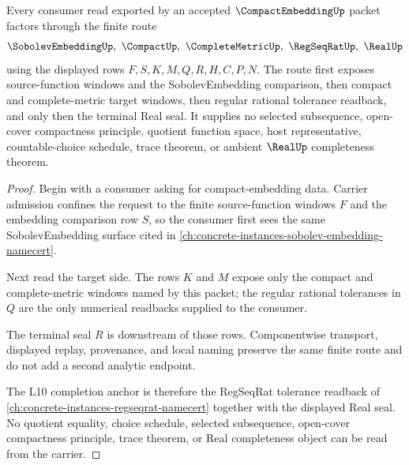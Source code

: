 \begin{theorem}
\label{thm:compact-embedding-finite-route}
Every consumer read exported by an accepted $\CompactEmbeddingUp$ packet factors through the finite route
$$
\SobolevEmbeddingUp,\ \CompactUp,\ \CompleteMetricUp,\ \RegSeqRatUp,\ \RealUp
$$
using the displayed rows $F,S,K,M,Q,R,H,C,P,N$. The route first exposes source-function windows and the SobolevEmbedding comparison, then compact and complete-metric target windows, then regular rational tolerance readback, and only then the terminal Real seal. It supplies no selected subsequence, open-cover compactness principle, quotient function space, host representative, countable-choice schedule, trace theorem, or ambient $\RealUp$ completeness theorem.
\end{theorem}
\begin{proof}
Begin with a consumer asking for compact-embedding data. Carrier admission confines the request to the finite source-function windows $F$ and the embedding comparison row $S$, so the consumer first sees the same SobolevEmbedding surface cited in \autoref{ch:concrete-instances-sobolev-embedding-namecert}.

Next read the target side. The rows $K$ and $M$ expose only the compact and complete-metric windows named by this packet; the regular rational tolerances in $Q$ are the only numerical readbacks supplied to the consumer.

The terminal seal $R$ is downstream of those rows. Componentwise transport, displayed replay, provenance, and local naming preserve the same finite route and do not add a second analytic endpoint.

The L10 completion anchor is therefore the RegSeqRat tolerance readback of \autoref{ch:concrete-instances-regseqrat-namecert} together with the displayed Real seal. No quotient equality, choice schedule, selected subsequence, open-cover compactness principle, trace theorem, or Real completeness object can be read from the carrier.
\end{proof}



